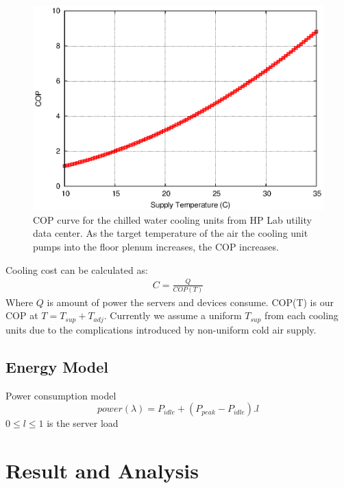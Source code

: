 \documentclass[JIP]{ipsj}
\begin{document}
\begin{figure}[thb]
\begin{center}
\includegraphics[scale=0.4]{graphs/cop.eps}
\end{center}
\caption{COP curve for the chilled water cooling units from HP Lab utility data center.
As the target temperature of the air the cooling unit pumps into the floor plenum increases, the COP increases.}
\label{fig:twotier}
\vspace{-2mm}
\end{figure} 


Cooling cost can be calculated as:
\begin{eqnarray}\label{eqn:cost}
C = \frac{Q}{COP(T)}
\end{eqnarray}
Where $Q$ is amount of power the servers and devices consume.
COP(T) is our COP at $T=T_{sup}+T_{adj}$.
Currently we assume a uniform $T_{sup}$ from each cooling units due to the complications introduced by non-uniform cold air supply.


\subsection{Energy Model}\label{energy model}
Power consumption model
\begin{equation}
	power(\lambda) = P_{idle} + (P_{peak}-P_{idle}). l 
\end{equation}
$0 \le l \le 1$ is the server load 

\section{Result and Analysis}\label{analysis}
\end{document}
